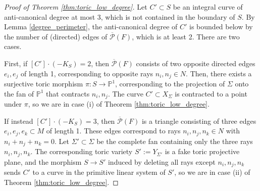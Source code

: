 \documentclass[12pt]{amsart}
\def\cM{{\mathcal{M}}}
\def\P{\mathbb{P}}
\def\cP{\mathcal{P}}
\newtheorem{theorem}[definition]{Theorem}
\begin{document}
   \begin{proof}[Proof of Theorem \ref{thm:toric_low_degree}]
    Let $C'\subset S$ be an integral curve of anti-canonical degree at most 3, which is not contained in the boundary of $S$. By Lemma \ref{degree_perimeter}, the anti-canonical degree of $C'$ is bounded below by the number of (directed) edges of $\overline{\cP}(F)$, which is at least 2. There are two cases.

    First, if $[C']\cdot (-K_S)=2$, then $\overline{\cP}(F)$ consists of two opposite directed edges $e_i,e_j$ of length 1, corresponding to opposite rays $n_i,n_j\in N$. Then, there exists a surjective toric morphism $\pi:S\to \P^1$, corresponding to the projection of $\Sigma$ onto the fan of $\P^1$ that contracts $n_i,n_j$. The curve $C'\subset X_{\Sigma}$ is contracted to a point under $\pi$, so we are in case (i) of Theorem \ref{thm:toric_low_degree}.

    If instead $[C']\cdot (-K_S)=3$, then $\overline{\cP}(F)$ is a triangle consisting of three edges $e_i,e_j,e_k\subset M$ of length 1. These edges correspond to rays $n_i,n_j,n_k\in N$ with $n_i+n_j+n_k=0$. Let $\Sigma'\subset \Sigma$ be the complete fan containing only the three rays $n_i,n_j,n_k$. The corresponding toric variety $S':=Y_{\Sigma'}$ is a fake toric projective plane, and the morphism $S\to S'$ induced by deleting all rays except $n_i,n_j,n_k$ sends $C'$ to a curve in the primitive linear system of $S'$, so we are in case (ii) of Theorem \ref{thm:toric_low_degree}.
   \end{proof}






\end{document}
